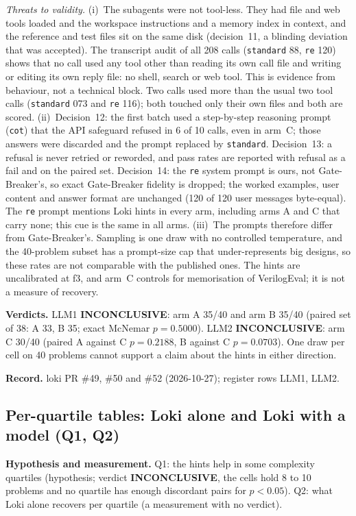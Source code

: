 \documentclass[conference]{IEEEtran}
\newcommand{\verdict}[1]{\textbf{\textsc{#1}}}
\newcommand{\hev}[1]{\par\smallskip\noindent\textbf{#1}}
\newcommand{\code}[1]{\texttt{#1}}
\begin{document}
\emph{Threats to validity.}
(i)~The subagents were not tool-less. They had file and web tools loaded and the workspace
instructions and a memory index in context, and the reference and test files sit on the same
disk (decision~11, a blinding deviation that was accepted). The transcript audit of all 208 calls
(\code{standard} 88, \code{re} 120) shows that no call used any tool other than reading its own
call file and writing or editing its own reply file: no shell, search or web tool. This is
evidence from behaviour, not a technical block. Two calls used more than the usual two tool calls
(\code{standard} 073 and \code{re} 116); both touched only their own files and both are scored.
(ii)~Decision~12: the first batch used a step-by-step reasoning prompt (\code{cot}) that the API
safeguard refused in 6 of 10 calls, even in arm~C; those answers were discarded and the prompt
replaced by \code{standard}. Decision~13: a refusal is never retried or reworded, and pass rates
are reported with refusal as a fail and on the paired set. Decision~14: the \code{re} system
prompt is ours, not Gate-Breaker's, so exact Gate-Breaker fidelity is dropped; the worked
examples, user content and answer format are unchanged (120 of 120 user messages byte-equal).
The \code{re} prompt mentions Loki hints in every arm, including arms A and C that carry none; this
cue is the same in all arms.
(iii)~The prompts therefore differ from Gate-Breaker's. Sampling is one draw with no controlled
temperature, and the 40-problem subset has a prompt-size cap that under-represents big designs,
so these rates are not comparable with the published ones. The hints are uncalibrated at f3, and
arm~C controls for memorisation of VerilogEval; it is not a measure of recovery.

\hev{Verdicts.} LLM1 \verdict{INCONCLUSIVE}: arm A 35/40 and arm B 35/40 (paired set of 38: A 33, B 35; exact McNemar $p=0.5000$).
LLM2 \verdict{INCONCLUSIVE}: arm C 30/40 (paired A against C $p=0.2188$, B against C $p=0.0703$). One draw per cell on 40 problems cannot support
a claim about the hints in either direction.


\hev{Record.} loki PR \#49, \#50 and \#52 (2026-10-27); register rows LLM1, LLM2.

\subsection{Per-quartile tables: Loki alone and Loki with a model (Q1, Q2)}
\label{sec:quartiles-rec}

\hev{Hypothesis and measurement.} Q1: the hints help in some complexity quartiles (hypothesis; verdict
\verdict{INCONCLUSIVE}, the cells hold 8 to 10 problems and no quartile has enough discordant pairs for $p<0.05$). Q2: what Loki alone
recovers per quartile (a measurement with no verdict).
\end{document}
